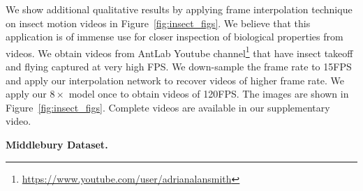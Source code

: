 \documentclass[10pt,twocolumn,letterpaper]{article}
\newcommand{\figref}[1]{Figure~\ref{#1}}
\newcommand{\eightx}{$8\times$}
\begin{document}
\begin{figure*}[t]
\begin{center}
    
    
    \end{center}
    \caption{{Qualitative Results for \eightx{} video frame interpolation on Insect Motion Videos. Frame at $t=0$ and $t=1$ are given as inputs to the network to predict the remaining 7 intermediate frames. Original Videos acquired from \texttt{AntLab} Youtube Channel. }}
    \label{fig:insect_figs}
    \vspace{-6pt}
\end{figure*} We show additional qualitative results by applying frame interpolation technique on insect motion videos in \figref{fig:insect_figs}. We believe that this application is of immense use for closer inspection of biological properties from videos. We obtain videos from AntLab Youtube channel\footnote{\url{https://www.youtube.com/user/adrianalansmith}} that have insect takeoff and flying captured at very high FPS. We down-sample the frame rate to 15FPS and apply our interpolation network to recover videos of higher frame rate. We apply our \eightx{} model once to obtain videos of 120FPS. The images are shown in \figref{fig:insect_figs}. Complete videos are available in our supplementary video.




{\bf Middlebury Dataset.} 
\end{document}
